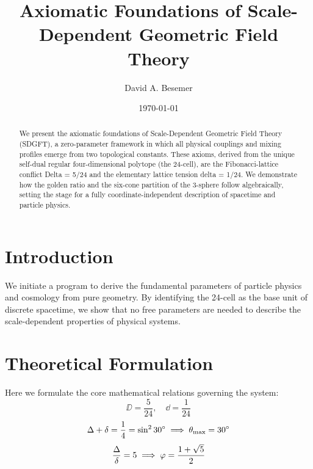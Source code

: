 \documentclass[amsmath,amssymb,aps,prd,twocolumn,superscriptaddress,nofootinbib]{revtex4-2}
\begin{document}

\title{Axiomatic Foundations of Scale-Dependent Geometric Field Theory}

\author{David A. Besemer}

\date{\today}

\begin{abstract}
We present the axiomatic foundations of Scale-Dependent Geometric Field Theory (SDGFT), a zero-parameter framework in which all physical couplings and mixing profiles emerge from two topological constants. These axioms, derived from the unique self-dual regular four-dimensional polytope (the 24-cell), are the Fibonacci-lattice conflict Delta = 5/24 and the elementary lattice tension delta = 1/24. We demonstrate how the golden ratio and the six-cone partition of the 3-sphere follow algebraically, setting the stage for a fully coordinate-independent description of spacetime and particle physics.
\end{abstract}

\maketitle

\section{Introduction}
We initiate a program to derive the fundamental parameters of particle physics and cosmology from pure geometry. By identifying the 24-cell as the base unit of discrete spacetime, we show that no free parameters are needed to describe the scale-dependent properties of physical systems.

\section{Theoretical Formulation}
Here we formulate the core mathematical relations governing the system:
\begin{equation}
  \DD = \frac{5}{24}, \quad \dd = \frac{1}{24}
\end{equation}
\begin{equation}
  \Delta + \delta = \frac{1}{4} = \sin^2 30^\circ \implies \theta_{\mathrm{max}} = 30^\circ
\end{equation}
\begin{equation}
  \frac{\Delta}{\delta} = 5 \implies \varphi = \frac{1 + \sqrt{5}}{2}
\end{equation}
\end{document}
